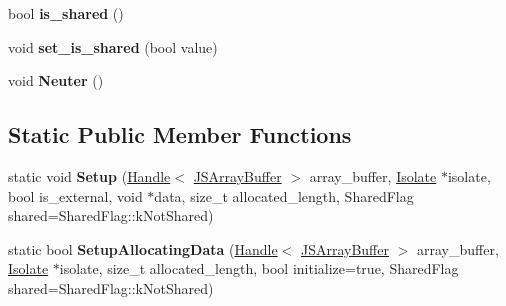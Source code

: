 \begin{DoxyCompactItemize}
\item 
bool {\bfseries is\+\_\+shared} ()\hypertarget{classv8_1_1internal_1_1_j_s_array_buffer_a8b5f3ec5b38c447e9b28c9b902a66d7f}{}\label{classv8_1_1internal_1_1_j_s_array_buffer_a8b5f3ec5b38c447e9b28c9b902a66d7f}

\item 
void {\bfseries set\+\_\+is\+\_\+shared} (bool value)\hypertarget{classv8_1_1internal_1_1_j_s_array_buffer_a0e17e89d43612e3e5a2e279e599802bf}{}\label{classv8_1_1internal_1_1_j_s_array_buffer_a0e17e89d43612e3e5a2e279e599802bf}

\item 
void {\bfseries Neuter} ()\hypertarget{classv8_1_1internal_1_1_j_s_array_buffer_ab8aa5ae4495b3caf14dad14329d40fe6}{}\label{classv8_1_1internal_1_1_j_s_array_buffer_ab8aa5ae4495b3caf14dad14329d40fe6}

\end{DoxyCompactItemize}
\subsection*{Static Public Member Functions}
\begin{DoxyCompactItemize}
\item 
static void {\bfseries Setup} (\hyperlink{classv8_1_1internal_1_1_handle}{Handle}$<$ \hyperlink{classv8_1_1internal_1_1_j_s_array_buffer}{J\+S\+Array\+Buffer} $>$ array\+\_\+buffer, \hyperlink{classv8_1_1internal_1_1_isolate}{Isolate} $\ast$isolate, bool is\+\_\+external, void $\ast$data, size\+\_\+t allocated\+\_\+length, Shared\+Flag shared=Shared\+Flag\+::k\+Not\+Shared)\hypertarget{classv8_1_1internal_1_1_j_s_array_buffer_aca1bd07fa89b0312b5a9b18743b5a866}{}\label{classv8_1_1internal_1_1_j_s_array_buffer_aca1bd07fa89b0312b5a9b18743b5a866}

\item 
static bool {\bfseries Setup\+Allocating\+Data} (\hyperlink{classv8_1_1internal_1_1_handle}{Handle}$<$ \hyperlink{classv8_1_1internal_1_1_j_s_array_buffer}{J\+S\+Array\+Buffer} $>$ array\+\_\+buffer, \hyperlink{classv8_1_1internal_1_1_isolate}{Isolate} $\ast$isolate, size\+\_\+t allocated\+\_\+length, bool initialize=true, Shared\+Flag shared=Shared\+Flag\+::k\+Not\+Shared)\hypertarget{classv8_1_1internal_1_1_j_s_array_buffer_a6d2a2315c6cfbcd094257e20213ba25e}{}\label{classv8_1_1internal_1_1_j_s_array_buffer_a6d2a2315c6cfbcd094257e20213ba25e}

\end{DoxyCompactItemize}
